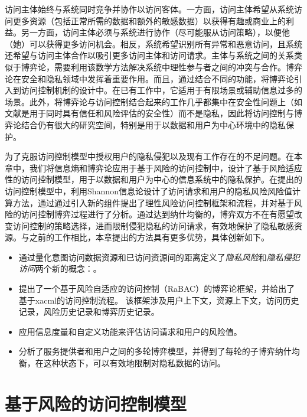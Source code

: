 访问主体始终与系统同时竞争并协作以访问客体。一方面，访问主体希望从系统访问更多资源（包括正常所需的数据和额外的敏感数据）以获得有趣或商业上的利益。另一方面，访问主体必须与系统进行协作（尽可能服从访问策略），以便他（她）可以获得更多访问机会。相反，系统希望识别所有异常和恶意访问，且系统还希望与访问主体合作以吸引更多访问主体和访问请求。主体与系统之间的关系类似于博弈论\cite{gibbons1992game}，需要利用该数学方法解决系统中理性参与者之间的冲突与合作。博弈论在安全和隐私领域中发挥着重要作用\cite{do2017game,zhu2018game}。而且，通过结合不同的功能，将博弈论引入到访问控制机制的设计中\cite{hu2014game,zhang2015towards,liu2016dynamic,gao2018game, helil2017non}。在已有工作中，它适用于有限场景\cite{hu2014game,gao2018game}或辅助信息过多的场景\cite{zhang2015towards,liu2016dynamic,helil2017non}。此外，将博弈论与访问控制结合起来的工作几乎都集中在安全性问题上（如文献\cite{helil2017non}是用于同时具有信任和风险评估的安全性）而不是隐私，因此将访问控制与博弈论结合仍有很大的研究空间，特别是用于以数据和用户为中心环境中的隐私保护。

为了克服访问控制模型中授权用户的隐私侵犯以及现有工作存在的不足问题。在本章中，我们将信息熵和博弈论应用于基于风险的访问控制中，设计了基于风险适应性的访问控制模型，用于以数据和用户为中心的信息系统中的隐私保护。在提出的访问控制模型中，利用Shannon信息论设计了访问请求和用户的隐私风险风险值计算方法，通过通过引入新的组件提出了理性风险访问控制框架和流程，并对基于风险的访问控制博弈过程进行了分析。通过达到纳什均衡的，博弈双方不在有愿望改变访问控制的策略选择，进而限制侵犯隐私的访问请求，有效地保护了隐私敏感资源。与之前的工作相比，本章提出的方法具有更多优势，具体创新如下。

\begin{itemize}
	
	\item 通过量化意图访问数据资源和已访问资源间的距离定义了\textit{隐私风险}和\textit{隐私侵犯访问}两个新的概念：。
	\item 提出了一个基于风险自适应的访问控制（RaBAC）的博弈论框架，并给出了基于xacml的访问控制流程。
	该框架涉及用户上下文，资源上下文，访问历史记录，风险历史记录和博弈历史记录。
	\item 应用信息度量和自定义功能来评估访问请求和用户的风险值。
	\item 分析了服务提供者和用户之间的多轮博弈模型，并得到了每轮的子博弈纳什均衡，在这种状态下，可以有效地限制对隐私数据的访问。
\end{itemize}


\section{基于风险的访问控制模型}
\label{sec:preliminaries}

